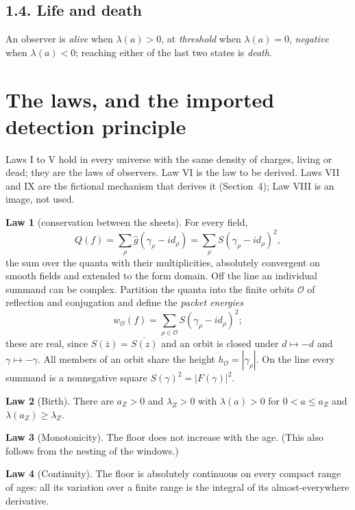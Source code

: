 \documentclass[11pt]{article}
\theoremstyle{definition}
\newtheorem{law}{Law}
\theoremstyle{remark}
\newcommand{\lamZ}{\lambda_{Z}}
\begin{document}
\subsection*{1.4. Life and death}
An observer is \emph{alive} when $\lambda(a)>0$, at \emph{threshold} when $\lambda(a)=0$, \emph{negative} when $\lambda(a)<0$; reaching either of the last two states is \emph{death}.

\section{The laws, and the imported detection principle}

Laws I to V hold in every universe with the same density of charges, living or dead; they are the laws of observers. Law VI is the law to be derived. Laws VII and IX are the fictional mechanism that derives it (Section~4); Law VIII is an image, not used.

\begin{law}[conservation between the sheets]\label{law:gauss}
For every field,
\[
Q(f)=\sum_{\rho}\hat g(\gamma_\rho-id_\rho)=\sum_\rho S(\gamma_\rho-id_\rho)^2 ,
\]
the sum over the quanta with their multiplicities, absolutely convergent on smooth fields and extended to the form domain. Off the line an individual summand can be complex. Partition the quanta into the finite orbits $\mathcal O$ of reflection and conjugation and define the \emph{packet energies}
\[
w_{\mathcal O}(f)=\sum_{\rho\in\mathcal O}S(\gamma_\rho-id_\rho)^2 ;
\]
these are real, since $S(\bar z)=\overline{S(z)}$ and an orbit is closed under $d\mapsto-d$ and $\gamma\mapsto-\gamma$. All members of an orbit share the height $h_{\mathcal O}=|\gamma_\rho|$. On the line every summand is a nonnegative square $S(\gamma)^2=|F(\gamma)|^2$.
\end{law}

\begin{law}[Birth]\label{law:birth}
There are $a_Z>0$ and $\lamZ>0$ with $\lambda(a)>0$ for $0<a\le a_Z$ and $\lambda(a_Z)\ge\lamZ$.
\end{law}

\begin{law}[Monotonicity]\label{law:mono}
The floor does not increase with the age. (This also follows from the nesting of the windows.)
\end{law}

\begin{law}[Continuity]\label{law:cont}
The floor is absolutely continuous on every compact range of ages: all its variation over a finite range is the integral of its almost-everywhere derivative.
\end{law}
\end{document}
